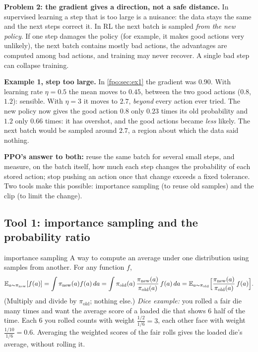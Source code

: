 \textbf{Problem 2: the gradient gives a direction, not a safe distance.} In supervised learning a step that is too large is a nuisance: the data stays the same and the next steps correct it. In RL the next batch is sampled \emph{from the new policy}. If one step damages the policy (for example, it makes good actions very unlikely), the next batch contains mostly bad actions, the advantages are computed among bad actions, and training may never recover. A single bad step can collapse training.

\textbf{Example 1, step too large.} In \cref{fpo:sec:ex1} the gradient was $0.90$. With learning rate $\eta=0.5$ the mean moves to $0.45$, between the two good actions ($0.8$, $1.2$): sensible. With $\eta=3$ it moves to $2.7$, \emph{beyond} every action ever tried. The new policy now gives the good action $0.8$ only $0.23$ times its old probability and $1.2$ only $0.66$ times: it has overshot, and the good actions became \emph{less} likely. The next batch would be sampled around $2.7$, a region about which the data said nothing.

\textbf{PPO's answer to both:} reuse the same batch for several small steps, and measure, on the batch itself, how much each step changes the probability of each stored action; stop pushing an action once that change exceeds a fixed tolerance. Two tools make this possible: importance sampling (to reuse old samples) and the clip (to limit the change).

\subsection{Tool 1: importance sampling and the probability ratio}
\begin{newc}{importance sampling}
A way to compute an average under one distribution using samples from another. For any function $f$,
\[
\mathbb{E}_{a\sim\pi_{\mathrm{new}}}[f(a)]=\int\pi_{\mathrm{new}}(a)f(a)\,da=\int\pi_{\mathrm{old}}(a)\,\frac{\pi_{\mathrm{new}}(a)}{\pi_{\mathrm{old}}(a)}\,f(a)\,da=\mathbb{E}_{a\sim\pi_{\mathrm{old}}}\Big[\frac{\pi_{\mathrm{new}}(a)}{\pi_{\mathrm{old}}(a)}\,f(a)\Big].
\]
(Multiply and divide by $\pi_{\mathrm{old}}$; nothing else.) \emph{Dice example:} you rolled a fair die many times and want the average score of a loaded die that shows 6 half of the time. Each 6 you rolled counts with weight $\frac{1/2}{1/6}=3$, each other face with weight $\frac{1/10}{1/6}=0.6$. Averaging the weighted scores of the fair rolls gives the loaded die's average, without rolling it.
\end{newc}

